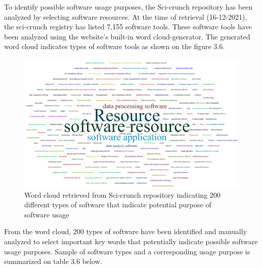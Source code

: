 To identify possible software usage purposes, the Sci-crunch repository has been analyzed by selecting software resources. At the time of retrieval (16-12-2021), the sci-crunch registry has listed 7,155 software tools. These software tools have been analyzed using the website's built-in word cloud-generator. The generated word cloud indicates types of software tools as shown on the figure 3.6.  \\
 

\begin{figure}[htbp]
	\centering
	\includegraphics[width=.75\textwidth]{4.graphics/figures/ch_3/cloud}
	\caption{Word cloud retrieved from Sci-crunch repository indicating 200 different types of software that  indicate potential purpose of software usage}
	\label{fig:chapter03:setup}
\end{figure}

From the word cloud, 200 types of software have been identified and manually analyzed to select important key words that potentially indicate possible software usage purposes. Sample of software types and a corresponding usage purpose is summarized on table 3.6 below.

